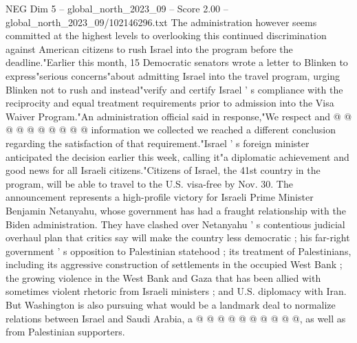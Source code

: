 \begin{textsample}{NEG Dim 5 – global\_north\_2023\_09 – Score 2.00 – global\_north\_2023\_09/102146296.txt}
The administration however seems committed at the highest levels to overlooking this continued discrimination against American citizens to rush Israel into the program before the deadline."Earlier this month, 15 Democratic senators wrote a letter to Blinken to express"serious concerns"about admitting Israel into the travel program, urging Blinken not to rush and instead"verify and certify Israel ' s compliance with the reciprocity and equal treatment requirements prior to admission into the Visa Waiver Program."An administration official said in response,"We respect and @ @ @ @ @ @ @ @ @ @ information we collected we reached a different conclusion regarding the satisfaction of that requirement."Israel ' s foreign minister anticipated the decision earlier this week, calling it"a diplomatic achievement and good news for all Israeli citizens."Citizens of Israel, the 41st country in the program, will be able to travel to the U.S. visa-free by Nov. 30.
The announcement represents a high-profile victory for Israeli Prime Minister Benjamin Netanyahu, whose government has had a fraught relationship with the Biden administration.
They have clashed over Netanyahu ' s contentious judicial overhaul plan that critics say will make the country less democratic ; his far-right government ' s opposition to Palestinian statehood ; its treatment of Palestinians, including its aggressive construction of settlements in the occupied West Bank ; the growing violence in the West Bank and Gaza that has been allied with sometimes violent rhetoric from Israeli ministers ; and U.S. diplomacy with Iran.
But Washington is also pursuing what would be a landmark deal to normalize relations between Israel and Saudi Arabia, a @ @ @ @ @ @ @ @ @ @, as well as from Palestinian supporters.

\end{textsample}
